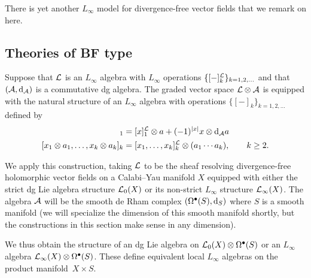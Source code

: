 

\parsec
There is yet another $L_\infty$ model for divergence-free vector fields that we remark on here.


\subsection{Theories of BF type}

\parsec
Suppose that $\mathcal L$ is an $L_\infty$ algebra with $L_\infty$ operations $\{[-]^\mathcal L_k\}_{k=1,2,\ldots}$ and that $(\mathcal A, {\rm d}_\mathcal A)$ is a commutative dg algebra. 
The graded vector space $\mathcal L \otimes \mathcal A$ is equipped with the natural structure of an $L_\infty$ algebra with operations $\{[-]_k\}_{k=1,2,\ldots}$ defined by
\begin{align*}
[x \otimes a]_1 & = [x]^\cL_1 \otimes a + (-1)^{|x|} x \otimes \d_\cA a \\
[x_1 \otimes a_1, \ldots , x_k \otimes a_k]_k & = [x_1,\ldots,x_k]^\cL_k \otimes (a_1 \cdots a_k), \qquad k \geq 2 .
\end{align*}

We apply this construction, taking $\mathcal L$ to be the sheaf resolving divergence-free holomorphic vector fields on a Calabi--Yau manifold $X$ equipped with either the strict dg Lie algebra structure $\mathcal L_0(X)$ or its non-strict $L_\infty$ structure $\mathcal L_\infty (X)$. 
The algebra $\mathcal A$ will be the smooth de Rham complex $(\Omega^\bullet(S) , {\rm d}_S)$ where $S$ is a smooth manifold (we will specialize the dimension of this smooth manifold shortly, but the constructions in this section make sense in any dimension). 

We thus obtain the structure of an dg Lie algebra on $\mathcal L_0(X) \otimes \Omega^{\bullet}(S)$ or an $L_\infty$ algebra $\mathcal L_\infty(X) \otimes \Omega^\bullet(S)$.
These define equivalent local $L_\infty$ algebras on the product manifold~$X \times S$. 

